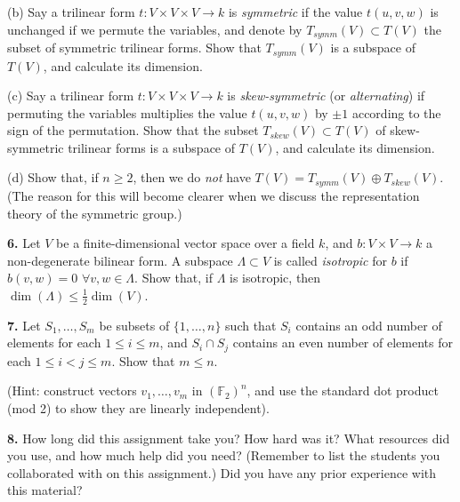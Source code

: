 \documentclass[11pt,letterpaper]{article}
\def\F{\mathbb{F}}
\begin{document}
(b) Say a trilinear form $t:V\times V\times V\to k$ is {\em symmetric} if
the value $t(u,v,w)$ is unchanged if we permute the variables, and denote
by $T_{symm}(V)\subset T(V)$ the subset of symmetric trilinear forms.
Show that $T_{symm}(V)$ is a subspace of $T(V)$, and calculate its
dimension.

(c) Say a trilinear form $t:V\times V\times V\to k$ is {\em skew-symmetric}
(or {\em alternating}) if permuting the variables multiplies the value 
$t(u,v,w)$ by $\pm 1$ according to the sign of the permutation. Show that
the subset $T_{skew}(V)\subset T(V)$ of skew-symmetric trilinear forms
is a subspace of $T(V)$, and calculate its dimension.

(d) Show that, if $n\geq 2$, then we do {\em not} have $T(V)=T_{symm}(V)
\oplus T_{skew}(V)$.  (The reason for this will become clearer when we
discuss the representation theory of the symmetric group.)
\medskip

{\bf 6.} Let $V$ be a finite-dimensional vector space over a field $k$, and
$b:V\times V\to k$ a non-degenerate bilinear form. A subspace
$\Lambda\subset V$ is called {\em isotropic} for $b$ if $b(v,w)=0$ $\forall
v,w\in\Lambda$. Show that, if $\Lambda$ is isotropic, then
$\dim(\Lambda)\leq \frac12 \dim(V)$.
\medskip


{\bf 7.} Let $S_1,\dots,S_m$ be subsets of $\{1,\dots,n\}$ such that
$S_i$ contains an odd number of elements for each $1\leq i\leq m$, 
and $S_i\cap S_j$ contains an even number of elements for each $1\leq
i<j\leq m$. Show that $m\leq n$.

(Hint: construct vectors $v_1,\dots,v_m$ in $(\F_2)^n$, and use the
standard dot product (mod 2) to show they are linearly independent). 
\medskip

{\bf 8.} How long did this assignment take you?  How hard was it?
What resources did you use, and how much help did you need?
(Remember to list the students you collaborated with on this assignment.)
Did you have any prior experience with this material?
\end{document}
